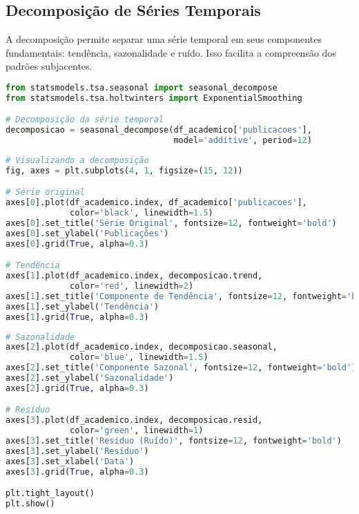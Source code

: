 \subsection{Decomposição de Séries Temporais}

A decomposição permite separar uma série temporal em seus componentes fundamentais: tendência, sazonalidade e ruído. Isso facilita a compreensão dos padrões subjacentes.

\begin{pythonbox}
\begin{lstlisting}[language=Python]
from statsmodels.tsa.seasonal import seasonal_decompose
from statsmodels.tsa.holtwinters import ExponentialSmoothing

# Decomposição da série temporal
decomposicao = seasonal_decompose(df_academico['publicacoes'], 
                                  model='additive', period=12)
\end{lstlisting}
\end{pythonbox}

\begin{pythonbox}
\begin{lstlisting}[language=Python]
# Visualizando a decomposição
fig, axes = plt.subplots(4, 1, figsize=(15, 12))

# Série original
axes[0].plot(df_academico.index, df_academico['publicacoes'], 
             color='black', linewidth=1.5)
axes[0].set_title('Série Original', fontsize=12, fontweight='bold')
axes[0].set_ylabel('Publicações')
axes[0].grid(True, alpha=0.3)

# Tendência
axes[1].plot(df_academico.index, decomposicao.trend, 
             color='red', linewidth=2)
axes[1].set_title('Componente de Tendência', fontsize=12, fontweight='bold')
axes[1].set_ylabel('Tendência')
axes[1].grid(True, alpha=0.3)
\end{lstlisting}
\end{pythonbox}

\begin{pythonbox}
\begin{lstlisting}[language=Python]
# Sazonalidade
axes[2].plot(df_academico.index, decomposicao.seasonal, 
             color='blue', linewidth=1.5)
axes[2].set_title('Componente Sazonal', fontsize=12, fontweight='bold')
axes[2].set_ylabel('Sazonalidade')
axes[2].grid(True, alpha=0.3)

# Resíduo
axes[3].plot(df_academico.index, decomposicao.resid, 
             color='green', linewidth=1)
axes[3].set_title('Resíduo (Ruído)', fontsize=12, fontweight='bold')
axes[3].set_ylabel('Resíduo')
axes[3].set_xlabel('Data')
axes[3].grid(True, alpha=0.3)

plt.tight_layout()
plt.show()
\end{lstlisting}
\end{pythonbox}


